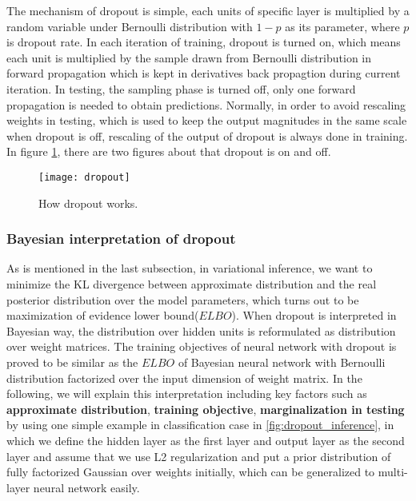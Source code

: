 The mechanism of dropout is simple, each units of specific layer is multiplied by a random variable under Bernoulli distribution with $1-p$ as its parameter, where $p$ is dropout rate. In each iteration of training, dropout is turned on, which means each unit is multiplied by the sample drawn from Bernoulli distribution in forward propagation which is kept in  derivatives back propagtion during current iteration. In testing, the sampling phase is turned off, only one forward propagation is needed to obtain predictions. Normally, in order to avoid rescaling weights in testing, which is used to keep the output magnitudes in the same scale when dropout is off, rescaling of the output of dropout is always done in training. In figure \ref{fig:dropout}, there are two figures about that dropout is on and off. 
\begin{figure}[h!]
	\begin{center}
		\texttt{[image: dropout]}
		\caption{How dropout works\cite{srivastava2014dropout}.}		
		\label{fig:dropout}
	\end{center}
\end{figure}


\subsubsection{Bayesian interpretation of dropout}
As is mentioned in the last subsection, in variational inference, we want to minimize the KL divergence between approximate distribution and the real posterior distribution over the model parameters, which turns out to be maximization of evidence lower bound($ELBO$). When dropout is interpreted in Bayesian way, the distribution over hidden units is reformulated as distribution over weight matrices. The training objectives of neural network with dropout is proved to be similar as the $ELBO$ of Bayesian neural network with Bernoulli distribution factorized over the input dimension of weight matrix. In the following, we will explain this interpretation including key factors such as \textbf{approximate distribution}, \textbf{training objective}, \textbf{marginalization in testing} by using one simple example in {classification} case in \ref{fig:dropout_inference}, in which we define the hidden layer as the first layer and output layer as the second layer and assume that we use L2 regularization and put a prior distribution of fully factorized Gaussian over weights initially, which can be generalized to multi-layer neural network easily.


